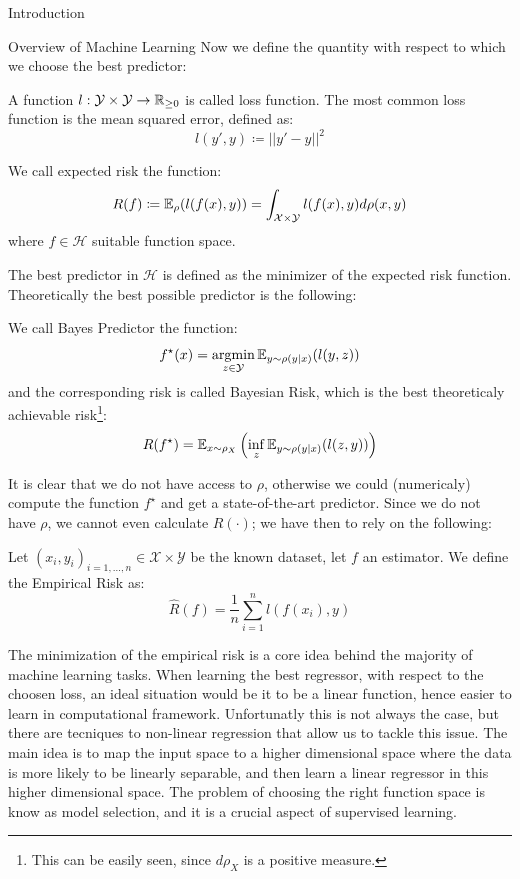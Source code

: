 \begin{chapter}{Introduction}
\begin{section}{Overview of Machine Learning }
  Now we define the quantity with respect to which we choose the best predictor:
  \begin{definition}
      A function $l : \mathcal{Y} \times \mathcal{Y} \to \mathbb{R}_{\geq 0}$ is called loss function. The most common loss function is
      the mean squared error, defined as:
      $$
          l(y', y) \coloneqq ||y'-y||^2
      $$
  \end{definition}
  \begin{definition}
      We call expected risk the function:
      $$
          R(f) \coloneqq \mathbb{E}_\rho(l(f(x), y)) = \int_{\mathcal{X}\times \mathcal{Y}}l(f(x), y) d\rho(x,y)
      $$
      where $f \in \mathcal{H}$ suitable function space.
  \end{definition}
  The best predictor in $\mathcal{H}$ is defined as the minimizer of the expected risk function.
  Theoretically the best possible predictor is the following:
  \begin{definition}
      We call Bayes Predictor the function:
      $$f^\star(x) = \operatorname*{argmin}_{z \in \mathcal{Y}}\mathbb{E}_{y \sim \rho(y|x)}(l(y, z))$$
      and the corresponding risk is called Bayesian Risk, which is the best theoreticaly achievable risk\footnote{This can be easily seen, since $d\rho_X$ is a positive measure.}:
      $$
          R(f^\star) = \mathbb{E}_{x \sim \rho_X}\left(\inf_z \mathbb{E}_{y \sim \rho(y|x)} (l(z, y))\right)
      $$
  \end{definition}
  It is clear that we do not have access to $\rho$, otherwise we could (numericaly) compute the function $f^\star$ and get a state-of-the-art predictor. Since we do not have $\rho$, we cannot even
  calculate $R(\cdot)$; we have then to rely on the following:
  \begin{definition}
      Let $(x_i, y_i)_{i=1, \dots, n} \in \mathcal{X}\times \mathcal{Y}$ be the known dataset, let $f$ an estimator. We define
      the Empirical Risk as:
      $$
          \hat{R}(f) = \frac{1}{n}\sum_{i=1}^n l(f(x_i), y)
      $$
  \end{definition}
  The minimization of the empirical risk is a core idea behind the majority of machine learning tasks.
  \vspace{5pt}
  \newline When learning the best regressor, with respect to the choosen loss, an ideal situation would be it to be a linear
  function, hence easier to learn in computational framework. Unfortunatly this is not always the case, but there are
  tecniques to non-linear regression that allow us to tackle this issue. The main idea is to map the input space to a higher
  dimensional space where the data is more likely to be linearly separable, and then learn a linear regressor in this higher dimensional space.
  The problem of choosing the right function space is know as model selection, and it is a crucial aspect of supervised learning.





\end{section}
\end{chapter}
